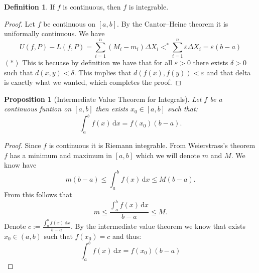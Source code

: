 \documentclass[11pt,a4paper]{article}
\theoremstyle{definition}
\newtheorem{definition}{Definition}[section]
\theoremstyle{plain}
\newtheorem{proposition}[theorem]{Proposition}
\newcommand\dx    {\,\mathrm{d}x}
\begin{document}
  \begin{definition}
    If $f$ is continuous, then $f$ is integrable.
  \end{definition}
  \begin{proof}
    Let $f$ be continuous on $[a,b]$.
    By the Cantor--Heine theorem it is uniformally continuous.
    We have
    \[
      U(f,P) - L(f,P) =
      \sum_{i=1}^{n}(M_i-m_i)\Delta X_i <^{*}
      \sum_{i=1}^n\varepsilon\Delta X_i = \varepsilon(b-a)
    \]
    $(*)$ This is becuase by definition we have that for all $\varepsilon > 0$
    there exists $\delta > 0$ such that $d(x,y) < \delta$. 
    This implies that $d(f(x),f(y)) < \varepsilon$
    and that delta is exactly what we wanted, which completes the proof.
  \end{proof}

  \begin{proposition}[Intermediate Value Theorem for Integrals]
    Let $f$ be a continuous funtion on $[a,b]$ then exists $x_0 \in [a,b]$
    such that: 
    \[
      \int_a^b f(x)\dx = f(x_0)(b - a).
    \]
  \end{proposition}
  \begin{proof}
    Since $f$ is continuous it is Riemann integrable. 
    From Weierstrass's theorem $f$ has a minimum and maximum in $[a,b]$ 
    which we will denote $m$ and $M$.
    We know have
    \[
      m (b - a) \le \int_a^b f(x)\dx \le M (b - a).
    \]
    From this follows that
    \[
      m \le \frac{\int_{a}^{b} f(x)\dx}{b - a} \le M.
    \]
    Denote $c := \frac{\int_{a}^{b} f(x)\dx}{b - a}$.
    By the intermediate value theorem we know that exists $x_0 \in (a,b)$
    such that $f(x_0) = c$ and thus:
    \[
      \int_{a}^{b} f(x)\dx = f(x_0)(b - a)
    \]
  \end{proof}

  \newpage
\end{document}
